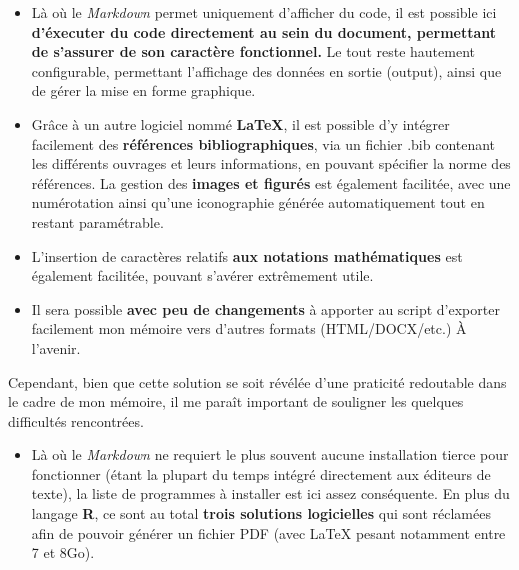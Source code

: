 \documentclass[
  11pt,
  french,
]{article}
\providecommand{\tightlist}{%
  \setlength{\itemsep}{0pt}\setlength{\parskip}{0pt}}
\begin{document}
\begin{itemize}
\item
  Là où le \emph{Markdown} permet uniquement d'afficher du code, il est
  possible ici \textbf{d'éxecuter du code directement au sein du
  document, permettant de s'assurer de son caractère fonctionnel.} Le
  tout reste hautement configurable, permettant l'affichage des données
  en sortie (output), ainsi que de gérer la mise en forme graphique.
\item
  Grâce à un autre logiciel nommé \textbf{LaTeX}, il est possible d'y
  intégrer facilement des \textbf{références bibliographiques}, via un
  fichier .bib contenant les différents ouvrages et leurs informations,
  en pouvant spécifier la norme des références. La gestion des
  \textbf{images et figurés} est également facilitée, avec une
  numérotation ainsi qu'une iconographie générée automatiquement tout en
  restant paramétrable.
\item
  L'insertion de caractères relatifs \textbf{aux notations
  mathématiques} est également facilitée, pouvant s'avérer extrêmement
  utile.
\item
  Il sera possible \textbf{avec peu de changements} à apporter au script
  d'exporter facilement mon mémoire vers d'autres formats
  (HTML/DOCX/etc.) À l'avenir.
\end{itemize}

Cependant, bien que cette solution se soit révélée d'une praticité
redoutable dans le cadre de mon mémoire, il me paraît important de
souligner les quelques difficultés rencontrées.

\begin{itemize}
\tightlist
\item
  Là où le \emph{Markdown} ne requiert le plus souvent aucune
  installation tierce pour fonctionner (étant la plupart du temps
  intégré directement aux éditeurs de texte), la liste de programmes à
  installer est ici assez conséquente. En plus du langage \textbf{R}, ce
  sont au total \textbf{trois solutions logicielles} qui sont réclamées
  afin de pouvoir générer un fichier PDF (avec LaTeX pesant notamment
  entre 7 et 8Go).
\end{itemize}
\end{document}
